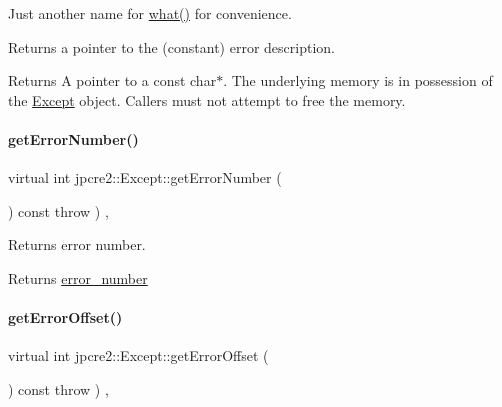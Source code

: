 Just another name for \hyperlink{classjpcre2_1_1Except_aa16bdec8432ee950955f7ad81a9655bb_aa16bdec8432ee950955f7ad81a9655bb}{what()} for convenience. 

Returns a pointer to the (constant) error description. \begin{DoxyReturn}{Returns}
A pointer to a const char$\ast$. The underlying memory is in possession of the \hyperlink{classjpcre2_1_1Except}{Except} object. Callers must not attempt to free the memory. 
\end{DoxyReturn}
\hypertarget{classjpcre2_1_1Except_a0f3e00116ab24b89836a2c2a66262e22_a0f3e00116ab24b89836a2c2a66262e22}{}\label{classjpcre2_1_1Except_a0f3e00116ab24b89836a2c2a66262e22_a0f3e00116ab24b89836a2c2a66262e22} 
\paragraph{\texorpdfstring{get\+Error\+Number()}{getErrorNumber()}}
{\footnotesize\ttfamily virtual int jpcre2\+::\+Except\+::get\+Error\+Number (\begin{DoxyParamCaption}{ }\end{DoxyParamCaption}) const throw  ) \hspace{0.3cm}{\ttfamily [inline]}, {\ttfamily [virtual]}}



Returns error number. 

\begin{DoxyReturn}{Returns}
\hyperlink{classjpcre2_1_1Except_aa72e1a71b4cdf1d4baecce57b63caafc}{error\+\_\+number} 
\end{DoxyReturn}
\hypertarget{classjpcre2_1_1Except_ade3963035e250d3cbf84ddaad2056fee_ade3963035e250d3cbf84ddaad2056fee}{}\label{classjpcre2_1_1Except_ade3963035e250d3cbf84ddaad2056fee_ade3963035e250d3cbf84ddaad2056fee} 
\paragraph{\texorpdfstring{get\+Error\+Offset()}{getErrorOffset()}}
{\footnotesize\ttfamily virtual int jpcre2\+::\+Except\+::get\+Error\+Offset (\begin{DoxyParamCaption}{ }\end{DoxyParamCaption}) const throw  ) \hspace{0.3cm}{\ttfamily [inline]}, {\ttfamily [virtual]}}



